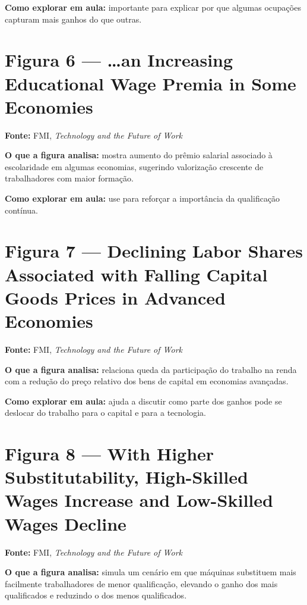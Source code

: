\documentclass[
]{book}
\theoremstyle{definition}
\theoremstyle{definition}
\theoremstyle{definition}
\theoremstyle{definition}
\theoremstyle{remark}
\begin{document}
\textbf{Como explorar em aula:} importante para explicar por que algumas ocupações capturam mais ganhos do que outras.

\section{Figura 6 --- \ldots an Increasing Educational Wage Premia in Some Economies}\label{figura-6-an-increasing-educational-wage-premia-in-some-economies}

\textbf{Fonte:} FMI, \emph{Technology and the Future of Work}

\textbf{O que a figura analisa:} mostra aumento do prêmio salarial associado à escolaridade em algumas economias, sugerindo valorização crescente de trabalhadores com maior formação.

\textbf{Como explorar em aula:} use para reforçar a importância da qualificação contínua.

\section{Figura 7 --- Declining Labor Shares Associated with Falling Capital Goods Prices in Advanced Economies}\label{figura-7-declining-labor-shares-associated-with-falling-capital-goods-prices-in-advanced-economies}

\textbf{Fonte:} FMI, \emph{Technology and the Future of Work}

\textbf{O que a figura analisa:} relaciona queda da participação do trabalho na renda com a redução do preço relativo dos bens de capital em economias avançadas.

\textbf{Como explorar em aula:} ajuda a discutir como parte dos ganhos pode se deslocar do trabalho para o capital e para a tecnologia.

\section{Figura 8 --- With Higher Substitutability, High-Skilled Wages Increase and Low-Skilled Wages Decline}\label{figura-8-with-higher-substitutability-high-skilled-wages-increase-and-low-skilled-wages-decline}

\textbf{Fonte:} FMI, \emph{Technology and the Future of Work}

\textbf{O que a figura analisa:} simula um cenário em que máquinas substituem mais facilmente trabalhadores de menor qualificação, elevando o ganho dos mais qualificados e reduzindo o dos menos qualificados.
\end{document}

